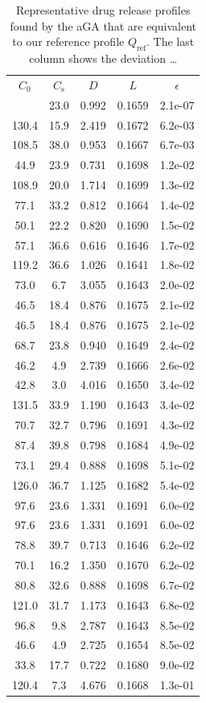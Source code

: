 \documentclass[superbib,unsortedaddress,preprint,byrevtex,aps,noshowpacs,titlepage]{revtex4}
\def\Qref{Q_\text{ref}}
\def\Co{C_0}
\def\Cs{C_\text{s}}
\begin{document}
\begingroup
\squeezetable
\begin{table}
  \caption{Representative drug release profiles found by the aGA that
    are equivalent to our reference profile $\Qref$. 
    The last column shows the deviation \ldots
  }
  \label{tab:results}
  \begin{ruledtabular}
    \begin{tabular}{ccccc}
      $\Co$ & $\Cs$ & $D$ & $L$ & $\epsilon$ \\
      \noalign{\smallskip}
      \hline
      70.0& 23.0& 0.992& 0.1659& 2.1e-07\\
      130.4& 15.9& 2.419& 0.1672& 6.2e-03\\
      108.5& 38.0& 0.953& 0.1667& 6.7e-03\\
      44.9& 23.9& 0.731& 0.1698& 1.2e-02\\
      108.9& 20.0& 1.714& 0.1699& 1.3e-02\\
      77.1& 33.2& 0.812& 0.1664& 1.4e-02\\
      50.1& 22.2& 0.820& 0.1690& 1.5e-02\\
      57.1& 36.6& 0.616& 0.1646& 1.7e-02\\
      119.2& 36.6& 1.026& 0.1641& 1.8e-02\\
      73.0& 6.7& 3.055& 0.1643& 2.0e-02\\
      46.5& 18.4& 0.876& 0.1675& 2.1e-02\\
      46.5& 18.4& 0.876& 0.1675& 2.1e-02\\
      68.7& 23.8& 0.940& 0.1649& 2.4e-02\\
      46.2& 4.9& 2.739& 0.1666& 2.6e-02\\
      42.8& 3.0& 4.016& 0.1650& 3.4e-02\\
      131.5& 33.9& 1.190& 0.1643& 3.4e-02\\
      70.7& 32.7& 0.796& 0.1691& 4.3e-02\\
      87.4& 39.8& 0.798& 0.1684& 4.9e-02\\
      73.1& 29.4& 0.888& 0.1698& 5.1e-02\\
      126.0& 36.7& 1.125& 0.1682& 5.4e-02\\
      97.6& 23.6& 1.331& 0.1691& 6.0e-02\\
      97.6& 23.6& 1.331& 0.1691& 6.0e-02\\
      78.8& 39.7& 0.713& 0.1646& 6.2e-02\\
      70.1& 16.2& 1.350& 0.1670& 6.2e-02\\
      80.8& 32.6& 0.888& 0.1698& 6.7e-02\\
      121.0& 31.7& 1.173& 0.1643& 6.8e-02\\
      96.8& 9.8& 2.787& 0.1643& 8.5e-02\\
      46.6& 4.9& 2.725& 0.1654& 8.5e-02\\
      33.8& 17.7& 0.722& 0.1680& 9.0e-02\\
      120.4& 7.3& 4.676& 0.1668& 1.3e-01\\
    \end{tabular}
  \end{ruledtabular}
\end{table}
\endgroup
\clearpage

\end{document}
